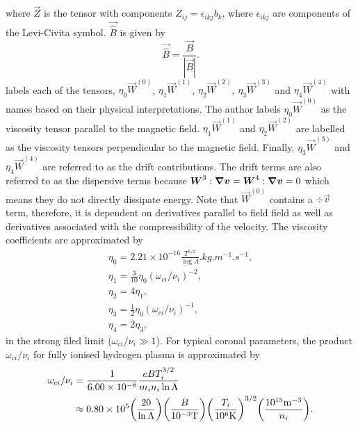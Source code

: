 where $\vec{Z}$ is the tensor with components $Z_{ij}=\epsilon_{ikj}b_k$, where $\epsilon_{ikj}$ are components of the Levi-Civita symbol. $\vec{\hat{B}}$ is given by
\begin{equation}
    \vec{\hat{B}}=\frac{\vec{B}}{|\vec{B}|}.
\end{equation}
\citet{Hogan1984} labels each of the tensors, $\eta_0\vec{W}^{(0)}$, $\eta_1\vec{W}^{(1)}$, $\eta_2\vec{W}^{(2)}$, $\eta_3\vec{W}^{(3)}$ and  $\eta_4\vec{W}^{(4)}$ with names based on their physical interpretations. The author labels $\eta_0\vec{W}^{(0)}$ as the viscosity tensor parallel to the magnetic field. $\eta_1\vec{W}^{(1)}$ and $\eta_2\vec{W}^{(2)}$ are labelled as the viscosity tensors perpendicular to the magnetic field. Finally, $\eta_3\vec{W}^{(3)}$ and $\eta_4\vec{W}^{(4)}$ are referred to as the drift contributions. The drift terms are also referred to as the dispersive terms because $\boldsymbol{W}^{3}:\grad \boldsymbol{v}=\boldsymbol{W}^{4}:\grad \boldsymbol{v}=0$ which means they do not directly dissipate energy. Note that $\vec{W}^{(0)}$ contains a $\div{\vec{v}}$ term, therefore, it is dependent on derivatives parallel to field field as well as derivatives associated with the compressibility of the velocity. The viscosity coefficients are approximated by
\begin{gather}
    \label{eq:braginskii_eta_0}
    \eta_0=2.21\times10^{-16}\frac{T^{5/2}}{\log \Lambda}\si{.kg.m^{-1}.s^{-1}}, \\
    \label{eq:braginskii_eta_1}
    \eta_1=\frac{3}{10}\eta_0(\omega_{ci}/\nu_i)^{-2}, \\
    \label{eq:braginskii_eta_2}
     \eta_2=4\eta_1,   \\
    \eta_3=\frac{1}{2}\eta_0(\omega_{ci}/\nu_i)^{-1}, \\
    \eta_4=2\eta_3,
\end{gather}
in the strong filed limit ($\omega_{ci}/\nu_i\gg1$). For typical coronal parameters, the product $\omega_{ci}/\nu_i$ for fully ionised hydrogen plasma is approximated by 
\begin{equation}
    \label{eq:proton_gyrofrequency_times_collision_time}
    \begin{aligned}
    \omega_{ci}/\nu_i &= \frac{1}{6.00\times10^{-8}}\frac{eBT_i^{3/2}}{m_in_i\ln\Lambda}\\
    &\approx 0.80\times10^5\qty(\frac{20}{\ln\Lambda})\qty(\frac{B}{10^{-3}\si{.T}})\qty(\frac{T_i}{10^6\si{.K}})^{3/2}\qty(\frac{10^{15}\si{.m^{-3}}}{n_i}).
    \end{aligned}
\end{equation}
